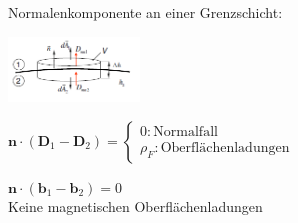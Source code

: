 \documentclass[english]{latex4ei/latex4ei_sheet}
\begin{document}
\begin{sectionbox}
Normalenkomponente an einer Grenzschicht:\\
\vspace{-0.28cm}
\begin{center}\includegraphics[width = 3.5cm]{./img/normal_rand.png}\end{center}
\begin{emphbox}
	$\mathbf{n} \cdot (\mathbf{D}_1 - \mathbf{D}_2) = \begin{cases}
		0 : \text{Normalfall} \\
		\rho_F: \text{Oberflächenladungen}
	\end{cases} $
\end{emphbox}

\begin{emphbox}
	$\mathbf{n} \cdot (\mathbf{b}_1 - \mathbf{b}_2) = 0$\\
	Keine magnetischen Oberflächenladungen
\end{emphbox}
\end{sectionbox}
\end{document}
